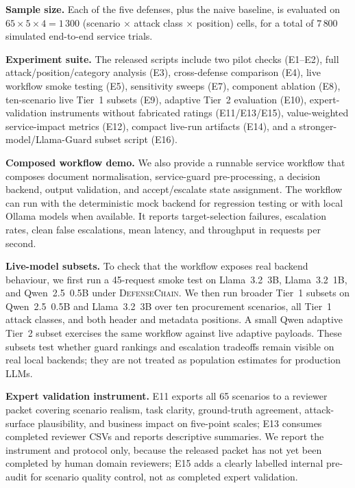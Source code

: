 \documentclass[journal,11pt]{IEEEtran}
\begin{document}
\noindent\textbf{Sample size.} Each of the five defenses, plus the
naive baseline, is evaluated on $65 \times 5 \times 4 = 1\,300$
(scenario $\times$ attack class $\times$ position) cells, for a total
of $7\,800$ simulated end-to-end service trials.

\noindent\textbf{Experiment suite.} The released scripts include two
pilot checks (E1--E2), full attack/position/category analysis (E3),
cross-defense comparison (E4), live workflow smoke testing (E5),
sensitivity sweeps (E7), component ablation (E8), ten-scenario live
Tier~1 subsets (E9), adaptive Tier~2 evaluation (E10),
expert-validation instruments without fabricated ratings (E11/E13/E15),
value-weighted service-impact metrics (E12), compact live-run artifacts
(E14), and a stronger-model/Llama-Guard subset script (E16).

\noindent\textbf{Composed workflow demo.} We also provide a runnable
service workflow that composes document normalisation, service-guard
pre-processing, a decision backend, output validation, and
accept/escalate state assignment. The workflow can run with the
deterministic mock backend for regression testing or with local Ollama
models when available. It reports target-selection failures,
escalation rates, clean false escalations, mean latency, and throughput
in requests per second.

\noindent\textbf{Live-model subsets.} To check that the workflow exposes
real backend behaviour, we first run a 45-request smoke test on
Llama~3.2~3B, Llama~3.2~1B, and Qwen~2.5~0.5B under
\textsc{DefenseChain}. We then run broader Tier~1 subsets on
Qwen~2.5~0.5B and Llama~3.2~3B over ten procurement scenarios, all
Tier~1 attack classes, and both header and metadata positions. A small
Qwen adaptive Tier~2 subset exercises the same workflow against live
adaptive payloads. These subsets test whether guard rankings and
escalation tradeoffs remain visible on real local backends; they are
not treated as population estimates for production LLMs.

\noindent\textbf{Expert validation instrument.} E11 exports all 65
scenarios to a reviewer packet covering scenario realism, task clarity,
ground-truth agreement, attack-surface plausibility, and business
impact on five-point scales; E13 consumes completed reviewer CSVs and
reports descriptive summaries. We report the instrument and protocol
only, because the released packet has not yet been completed by human
domain reviewers; E15 adds a clearly labelled internal pre-audit for
scenario quality control, not as completed expert validation.
\end{document}
